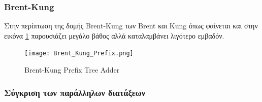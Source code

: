 \subsubsection*{Brent-Kung}
Στην περίπτωση της δομής Brent-Kung των Βrent και Kung \cite{Brent:1982:RLP:1309296.1309891}
όπως φαίνεται και στην εικόνα \ref{BrentKungTree} παρουσιάζει μεγάλο βάθος αλλά καταλαμβάνει
λιγότερο εμβαδόν.
\begin{figure}[H]
    \centering
    \texttt{[image: Brent\_Kung\_Prefix.png]}
    \caption{Brent-Kung Prefix Tree Adder}
    \label{BrentKungTree}
\end{figure}







\subsubsection*{Σύγκριση των παράλληλων διατάξεων}

